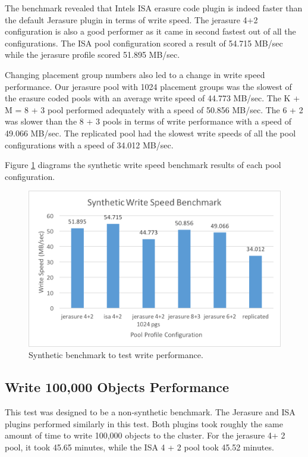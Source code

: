 \documentclass[conference,compsoc]{IEEEtran}
\begin{document}
The benchmark revealed that Intel\textquotesingle s ISA erasure code plugin is indeed faster than the default Jerasure plugin in terms of write speed. The jerasure 4+2 configuration is also a good performer as it came in second fastest out of all the configurations. The ISA pool configuration scored a result of 54.715 MB/sec while the jerasure profile scored 51.895 MB/sec. 

Changing placement group numbers also led to a change in write speed performance. Our jerasure pool with 1024 placement groups was the slowest of the erasure coded pools with an average write speed of 44.773 MB/sec.  The K + M = 8 + 3 pool performed adequately with a speed of 50.856 MB/sec. The 6 + 2 was slower than the 8 + 3 pools in terms of write performance with a speed of 49.066 MB/sec. The replicated pool had the slowest write speeds of all the pool configurations with a speed of 34.012 MB/sec. 

Figure \ref{fig:Synthetic} diagrams the synthetic write speed benchmark results of each pool configuration. 

\begin{figure}

\includegraphics[width=\linewidth]{Synthetic.png}
\caption{Synthetic benchmark to test write performance.}
\label{fig:Synthetic}

\end{figure}
 
\subsection{Write 100,000 Objects Performance}

This test was designed to be a non-synthetic benchmark. The Jerasure and ISA plugins performed similarly in this test. Both plugins took roughly the same amount of time to write 100,000 objects to the cluster. For the jerasure 4+ 2 pool, it took 45.65 minutes, while the ISA 4 + 2 pool took 45.52 minutes. 
\end{document}

